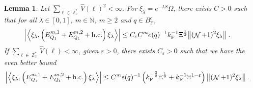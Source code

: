 \documentclass[12pt,a4paper]{article}
\numberwithin{equation}{section}
\newcommand{\NNN}{\mathbb{N}}
\newcommand{\1}{\mathbb{I}}
\newcommand{\F}{\mathrm{F}}
\DeclareMathOperator{\Z}{\mathbb{Z}}
\DeclareMathOperator{\NN}{\mathcal{N}}
\newcommand{\half}{\frac{1}{2}}
\newcommand{\eva}[1]{\left\langle #1 \right\rangle}
\theoremstyle{plain}
\newtheorem{lemma}[theorem]{Lemma}
\theoremstyle{definition}
\theoremstyle{remark}
\theoremstyle{plain}
\theoremstyle{definition}
\theoremstyle{remark}
\begin{document}
\begin{lemma} \label{lem:EQ111}
Let $ \sum_{\ell \in \Z_3^*} \hat{V}(\ell)^2 < \infty $. For $\xi_\lambda = e^{-\lambda S} \Omega$, there exists $ C > 0 $ such that for all $ \lambda \in [0,1] $, $ m \in \NNN $, $ m \ge 2 $ and $ q \in B_{\F}^c $,
\begin{equation} \label{eq:estEQ111_Coulomb}
\begin{aligned}
	\abs{\eva{\xi_\lambda,\left(E^{m,1}_{Q_1}+E^{m,2}_{Q_1}+\mathrm{h.c.}\right) \xi_\lambda }} 
	\leq C_\varepsilon C^m e(q)^{-1}
		k_{\F}^{-1} \Xi^{\half}
		\norm{ (\NN+1)^2 \xi_\lambda} \;.
\end{aligned}
\end{equation}
If $ \sum_{\ell \in \Z_3^*} \hat{V}(\ell) < \infty $, given $ \varepsilon > 0 $, there exists $ C_\varepsilon > 0 $ such that we have the even better bound
\begin{equation} \label{eq:estEQ111}
\begin{aligned}
	\abs{\eva{\xi_\lambda,\left(E^{m,1}_{Q_1}+E^{m,2}_{Q_1}+\mathrm{h.c.}\right) \xi_\lambda }} 
	\leq C^m e(q)^{-1} \left(
		k_{\F}^{-\frac{3}{2}} \Xi^\half
		+ k_{\F}^{-1}\Xi^{1-\varepsilon} \right)
		\norm{ (\NN+1)^2 \xi_\lambda} \;.
\end{aligned}
\end{equation}
\end{lemma}
\end{document}
